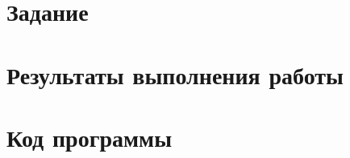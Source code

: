\documentclass[12pt, a4paper]{article}
\begin{document}
	
	
	
	\section{Задание}
	
	\newpage
	
	\section{Результаты выполнения работы}
	
	\newpage
	
	\section{Код программы}
	
	
\end{document}
